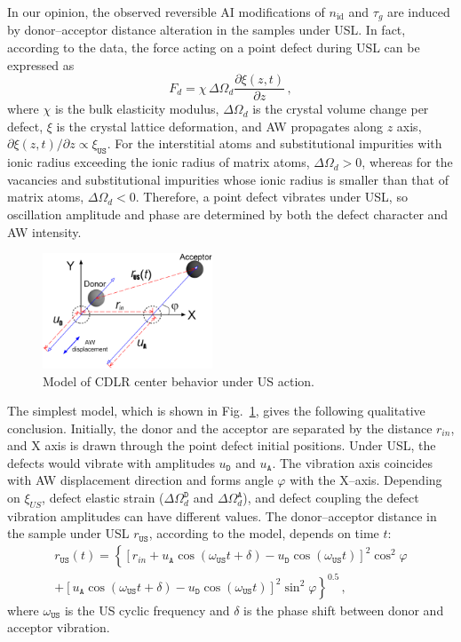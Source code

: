 \documentclass[aip,jap, amsmath,amssymb,reprint]{revtex4-1}
\begin{document}
In our opinion, the observed reversible AI modifications of $n_{\mathrm{id}}$ and $\tau_g$ are induced by
donor--acceptor distance alteration in the samples under USL.
In fact, according to the data,\cite{MirzadeJAP2011,PeleshchakUJF2016} the force acting on a point defect during USL can be expressed as
\begin{equation}
\label{eqFd}
F_d=\chi\,\Delta\Omega_d\frac{\partial \xi(z,t)}{\partial z}\,,
\end{equation}
where
$\chi$ is the bulk elasticity modulus,
$\Delta\Omega_d$ is the crystal volume change per defect,
$\xi$ is the crystal lattice deformation,
and AW propagates along $z$ axis,
$\partial \xi(z,t)/\partial z\propto \xi_{\mathtt{US}}$.
For the interstitial atoms and substitutional impurities with ionic radius exceeding the ionic radius of matrix
atoms, $\Delta\Omega_d > 0$, whereas
for the vacancies and substitutional impurities whose ionic radius is smaller than that of matrix atoms, $\Delta\Omega_d < 0$.
Therefore, a point defect vibrates under USL, so oscillation amplitude and phase are determined by both the defect character and AW intensity.

\begin{figure}
\includegraphics[width=0.45\textwidth]{fig_5}%
\caption{\label{fig_Model}
Model of CDLR center behavior under US action.
}%
\end{figure}


The simplest model, which is shown in Fig.~\ref{fig_Model}, gives the following  qualitative conclusion.
Initially, the donor and the acceptor are separated by the distance $r_{in}$,
and X axis is drawn through the point defect initial positions.
Under USL, the defects would vibrate with amplitudes $u_\mathtt{D}$ and $u_\mathtt{A}$.
The vibration axis coincides with AW displacement direction and forms angle $\varphi$ with  the X--axis.
Depending on $\xi_{U\!S}$, defect elastic strain ($\Delta\Omega_d^\mathtt{D}$ and $\Delta\Omega_d^\mathtt{A}$), and defect coupling the defect vibration amplitudes can have different values.
The donor--acceptor distance in the sample under USL $r_\mathtt{US}$, according to the model, depends on time $t$:
\begin{multline}
\label{eqrUS}
r_\mathtt{US}(t)=\left\{[r_{in}+u_\mathtt{A}\cos(\omega_\mathtt{US}t+\delta)-u_\mathtt{D}\cos(\omega_\mathtt{US}t)]^2\cos^2\varphi \right.\\
    \left.+ [u_\mathtt{A}\cos(\omega_\mathtt{US}t+\delta)-u_\mathtt{D}\cos(\omega_\mathtt{US}t)]^2\sin^2\varphi\right\}^{0.5}\,,
\end{multline}
where $\omega_\mathtt{US}$ is the US cyclic frequency and
$\delta$ is the phase shift between donor and acceptor vibration.
\end{document}
